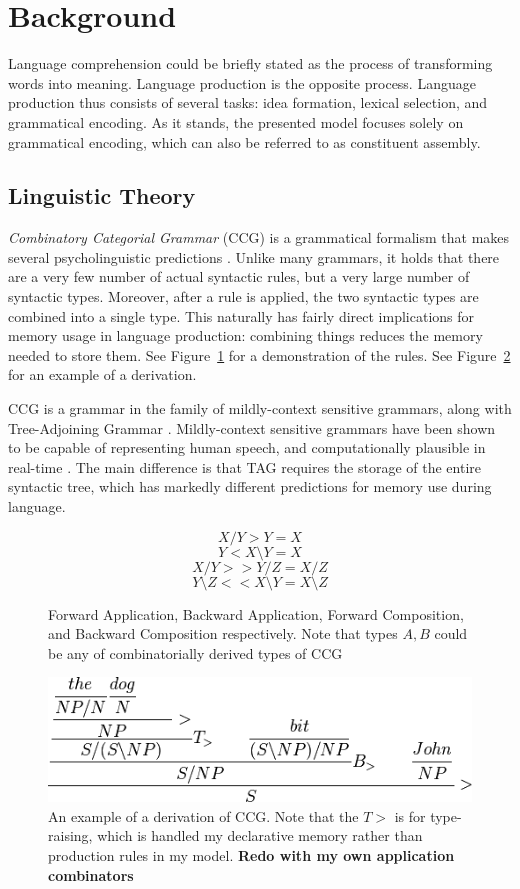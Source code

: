 \section{Background}\label{sec:ccg}
Language comprehension could be briefly stated as the process of transforming words into meaning. Language production is the opposite process. Language production thus consists of several tasks: idea formation, lexical selection, and grammatical encoding. As it stands, the presented model focuses solely on grammatical encoding, which can also be referred to as constituent assembly. 

\subsection{Linguistic Theory}
\textit{Combinatory Categorial Grammar} (CCG) is a grammatical formalism that makes several psycholinguistic predictions \citep{ccg}. Unlike many grammars, it holds that there are a very few number of actual syntactic rules, but a very large number of syntactic types. Moreover, after a rule is applied, the two syntactic types are combined into a single type. This naturally has fairly direct implications for memory usage in language production: combining things reduces the memory needed to store them. See Figure~\ref{eqn:ccg} for a demonstration of the rules. See Figure~\ref{fig:ccg} for an example of a derivation.

CCG is a grammar in the family of mildly-context sensitive grammars, along with Tree-Adjoining Grammar \citep{tag}. Mildly-context sensitive grammars have been shown to be capable of representing human speech, and computationally plausible in real-time \citep{convergence}. The main difference is that TAG requires the storage of the entire syntactic tree, which has markedly different predictions for memory use during language.

\begin{figure}
\[X/Y > Y = X\]
\[Y < X\setminus Y = X\]
\[X/Y >> Y/Z = X/Z\]
\[Y\setminus Z << X\setminus Y = X\setminus Z\]
\caption{Forward Application, Backward Application, Forward Composition, and Backward Composition respectively. Note that types $A,B$ could be any of combinatorially derived types of CCG}
\label{eqn:ccg}
\end{figure}

\begin{figure}[ht]
\begin{center}
\includegraphics[width=0.95\columnwidth]{figures/ccg}
\end{center}
\caption{An example of a derivation of CCG. Note that the $T>$ is for type-raising, which is handled my declarative memory rather than production rules in my model. \textbf{Redo with my own application combinators}}  
\label{fig:ccg}
\end{figure}

